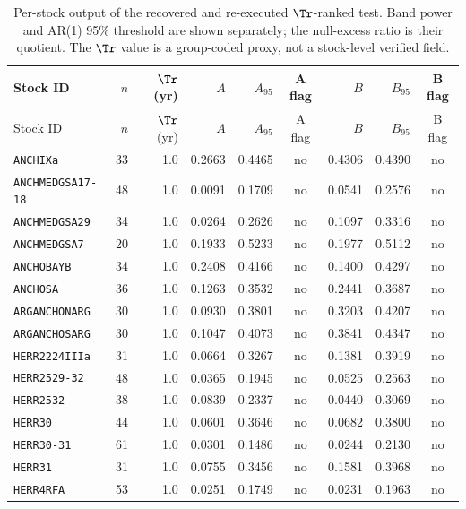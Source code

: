 \begin{landscape}
\scriptsize
\setlength{\tabcolsep}{4pt}
\begin{longtable}{@{}p{2.9cm}r r r r c r r c@{}}
\caption{Per-stock output of the recovered and re-executed \(\Tr\)-ranked test. Band power and AR(1) 95\% threshold are shown separately; the null-excess ratio is their quotient. The \(\Tr\) value is a group-coded proxy, not a stock-level verified field.}\label{tab:tr-stock}\\
\toprule Stock ID & \(n\) & \(\Tr\) (yr) & \(A\) & \(A_{95}\) & A flag & \(B\) & \(B_{95}\) & B flag \\
\midrule\endfirsthead
\toprule Stock ID & \(n\) & \(\Tr\) (yr) & \(A\) & \(A_{95}\) & A flag & \(B\) & \(B_{95}\) & B flag \\
\midrule\endhead
\bottomrule\endfoot
\texttt{ANCHIXa} & 33 & 1.0 & 0.2663 & 0.4465 & no & 0.4306 & 0.4390 & no \\
\texttt{ANCHMEDGSA17-18} & 48 & 1.0 & 0.0091 & 0.1709 & no & 0.0541 & 0.2576 & no \\
\texttt{ANCHMEDGSA29} & 34 & 1.0 & 0.0264 & 0.2626 & no & 0.1097 & 0.3316 & no \\
\texttt{ANCHMEDGSA7} & 20 & 1.0 & 0.1933 & 0.5233 & no & 0.1977 & 0.5112 & no \\
\texttt{ANCHOBAYB} & 34 & 1.0 & 0.2408 & 0.4166 & no & 0.1400 & 0.4297 & no \\
\texttt{ANCHOSA} & 36 & 1.0 & 0.1263 & 0.3532 & no & 0.2441 & 0.3687 & no \\
\texttt{ARGANCHONARG} & 30 & 1.0 & 0.0930 & 0.3801 & no & 0.3203 & 0.4207 & no \\
\texttt{ARGANCHOSARG} & 30 & 1.0 & 0.1047 & 0.4073 & no & 0.3841 & 0.4347 & no \\
\texttt{HERR2224IIIa} & 31 & 1.0 & 0.0664 & 0.3267 & no & 0.1381 & 0.3919 & no \\
\texttt{HERR2529-32} & 48 & 1.0 & 0.0365 & 0.1945 & no & 0.0525 & 0.2563 & no \\
\texttt{HERR2532} & 38 & 1.0 & 0.0839 & 0.2337 & no & 0.0440 & 0.3069 & no \\
\texttt{HERR30} & 44 & 1.0 & 0.0601 & 0.3646 & no & 0.0682 & 0.3800 & no \\
\texttt{HERR30-31} & 61 & 1.0 & 0.0301 & 0.1486 & no & 0.0244 & 0.2130 & no \\
\texttt{HERR31} & 31 & 1.0 & 0.0755 & 0.3456 & no & 0.1581 & 0.3968 & no \\
\texttt{HERR4RFA} & 53 & 1.0 & 0.0251 & 0.1749 & no & 0.0231 & 0.1963 & no \\

\end{longtable}
\end{landscape}
